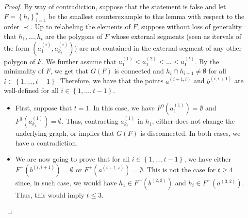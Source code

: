\documentclass[12pt]{article}
\theoremstyle{definition}
\begin{document}
     \begin{proof}
         By way of contradiction,
         suppose that the statement is
         false and let
         $F = \left\{h_{i}\right\}_{i = 1}^{n}$ 
         be the smallest counterexample
         to this lemma with respect
         to the order $\prec$.
         Up to relabeling the elements
         of $F$, suppose without loss
         of generality that
         $h_{1}, \ldots, h_{t}$ are
         the polygons of $F$ whose
         external segments (seen as itervals
         of the form
         $\left(a_1^{\left(i\right)}, a_{k_{i}}^{\left(i\right)}\right)$) 
         are not contained
         in the external segment of 
         any other polygon of $F$.
         We further assume that
         $a_1^{\left(1\right)} <
         a_1^{\left(2\right)} < \ldots < 
         a_1^{\left(t\right)}$.
         By the minimality of $F$, we get
         that $G\left(F\right)$ is
         connected and $h_{i} \cap h_{i+1} \neq \emptyset$
         for all $i \in \left\{1, \ldots, t-1\right\}$.
         Therefore, we have that the points
         $a^{\left(i+1, i\right)}$ and
         $b^{\left(i, i+1\right)}$ are
         well-defined for all 
         $i \in \left\{1, \ldots, t-1\right\}$.
         
         \begin{itemize}
             \item First, suppose that $t = 1$.
             In this case, we have $F^{0}\left(a_1^{\left(1\right)}\right)
             = \emptyset$ and
             $F^{0}\left(a_{k_1}^{\left(1\right)}\right) = \emptyset$.
             Thus, contracting
             $a_{k_{i}}^{\left(1\right)}$ in $h_1$,
             either does not change the underlying graph,
             or implies that $G\left(F\right)$ is
             disconnected. In both cases, we have a contradiction.

             \item We are now going to prove that
             for all $i \in \left\{1, \ldots, t -1\right\}$,
             we have either $F^{-}\left(b^{\left(i, i+1\right)}\right)
             = \emptyset$ or 
             $F^{+}\left(a^{\left(i+1, i\right)}\right)
             = \emptyset$. This is
             not the case for $t \geq 4$ since,
             in such case, we would have 
             $h_1 \in F^{-}\left(b^{\left(2, 3\right)}\right)$
             and $h_{t} \in F^{+}\left(a^{\left(3, 2\right)}\right)$.
             Thus, this would imply $t \leq 3$.


\end{itemize}
\end{proof}
\end{document}
